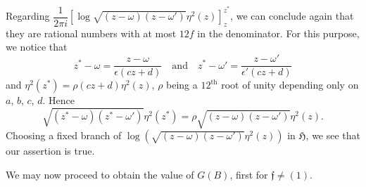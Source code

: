 Regarding $\dfrac{1}{2\pi
  i}[\log\sqrt{(z-\omega)(z-\omega')}\eta^{2}(z)]^{z^{\ast}}_{z}$, we
can conclude again that they are rational numbers with at most $12f$
in the denominator. For this purpose, we notice that
$$
z^{\ast}-\omega=\frac{z-\omega}{\epsilon(cz+d)}\quad\text{and}\quad
z^{\ast}-\omega'=\frac{z-\omega'}{\epsilon'(cz+d)}
$$
and $\eta^{2}(z^{\ast})=\rho(cz+d)\eta^{2}(z)$, $\rho$ being a
$12^{\text{th}}$ root of unity depending only on $a$, $b$, $c$,
$d$. Hence
$$
\sqrt{(z^{\ast}-\omega)(z^{\ast}-\omega')}\eta^{2}(z^{\ast})=\rho\sqrt{(z-\omega)(z-\omega')}\eta^{2}(z).
$$
Choosing a fixed branch of
$\log(\sqrt{(z-\omega)(z-\omega')}\eta^{2}(z))$ in $\mathfrak{H}$, we
see that our assertion is true.

We may now proceed to obtain the value of $G(B)$, first for
$\mathfrak{f}\neq (1)$. 

